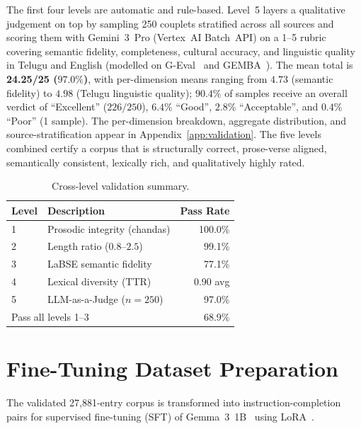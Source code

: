 \documentclass[11pt]{article}
\begin{document}
The first four levels are automatic and rule-based. Level~5 layers a
qualitative judgement on top by sampling 250 couplets stratified across
all sources and scoring them with Gemini~3~Pro (Vertex~AI Batch~API)
on a 1--5 rubric covering semantic fidelity, completeness, cultural
accuracy, and linguistic quality in Telugu and English (modelled on
G-Eval~\citep{liu2023geval} and GEMBA~\citep{kocmi2023gemba}). The
mean total is \textbf{24.25/25 ($97.0\%$)}, with per-dimension means
ranging from $4.73$ (semantic fidelity) to $4.98$ (Telugu linguistic
quality); $90.4\%$ of samples receive an overall verdict of
``Excellent'' ($226/250$), $6.4\%$ ``Good'', $2.8\%$ ``Acceptable'',
and $0.4\%$ ``Poor'' (1 sample). The per-dimension breakdown, aggregate distribution, and
source-stratification appear in Appendix~\ref{app:validation}. The five
levels combined certify a corpus that is structurally correct,
prose-verse aligned, semantically consistent, lexically rich, and
qualitatively highly rated.

\begin{table}[t]
\centering
\small
\caption{Cross-level validation summary.}
\label{tab:validation}
\begin{tabular}{llr}
\toprule
\textbf{Level} & \textbf{Description} & \textbf{Pass Rate} \\
\midrule
1 & Prosodic integrity (chandas)      & 100.0\% \\
2 & Length ratio ($0.8$--$2.5$)       &  99.1\% \\
3 & LaBSE semantic fidelity           &  77.1\% \\
4 & Lexical diversity (TTR)           & 0.90 avg \\
5 & LLM-as-a-Judge ($n{=}250$)        &  97.0\% \\
\midrule
\multicolumn{2}{l}{Pass all levels 1--3} & 68.9\% \\
\bottomrule
\end{tabular}
\end{table}

\section{Fine-Tuning Dataset Preparation}
\label{sec:finetuning}

The validated 27,881-entry corpus is transformed into instruction-completion
pairs for supervised fine-tuning (SFT) of Gemma~3~1B~\citep{gemma2024}
using LoRA~\citep{hu2022lora}.
\end{document}
